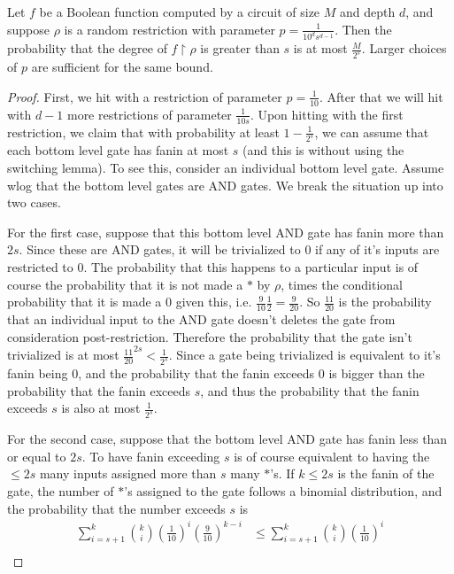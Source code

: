 \begin{lemma}
	Let $f$ be a Boolean function computed by a circuit of size $M$ and depth $d$, and suppose $\rho$ is a random restriction with parameter $p = \frac{1}{10^ds^{d-1}}$. Then the probability that the degree of $f\restriction \rho$ is greater than $s$ is at most $\frac{M}{2^s}$. Larger choices of $p$ are sufficient for the same bound.
\end{lemma}
\begin{proof}
	First, we hit with a restriction of parameter $p = \frac{1}{10}$. After that we will hit with $d-1$ more restrictions of parameter $\frac{1}{10s}$. Upon hitting with the first restriction, we claim that with probability at least $1-\frac{1}{2^s}$, we can assume that each bottom level gate has fanin at most $s$ (and this is without using the switching lemma). To see this, consider an individual bottom level gate. Assume wlog that the bottom level gates are AND gates. We break the situation up into two cases. \par 
	For the first case, suppose that this bottom level AND gate has fanin more than $2s$. Since these are AND gates, it will be trivialized to $0$ if any of it's inputs are restricted to $0$. The probability that this happens to a particular input is of course the probability that it is not made a $*$ by $\rho$, times the conditional probability that it is made a $0$ given this, i.e. $\frac{9}{10}\frac{1}{2} = \frac{9}{20}$. So $\frac{11}{20}$ is the probability that an individual input to the AND gate doesn't deletes the gate from consideration post-restriction. Therefore the probability that the gate isn't trivialized is at most $\frac{11}{20}^{2s} < \frac{1}{2^s}$. Since a gate being trivialized is equivalent to it's fanin being $0$, and the probability that the fanin exceeds $0$ is bigger than the probability that the fanin exceeds $s$, and thus the probability that the fanin exceeds $s$ is also at most $\frac{1}{2^s}$. \par 
	For the second case, suppose that the bottom level AND gate has fanin less than or equal to $2s$. To have fanin exceeding $s$ is of course equivalent to having the $\leq 2s$ many inputs assigned more than $s$ many $*$'s. If $k \leq 2s$ is the fanin of the gate, the number of $*$'s assigned to the gate follows a binomial distribution, and the probability that the number exceeds $s$ is 
	\begin{align}
		 \sum_{i=s+1}^{k} {k \choose i} \left( \frac{1}{10}\right)^i \left(\frac{9}{10} \right)^{k-i} &\leq \sum_{i=s+1}^{k} {k \choose i} \left( \frac{1}{10}\right)^i \\

\end{align}
\end{proof}

